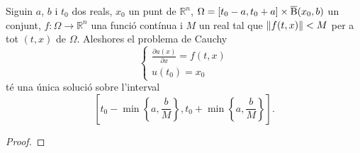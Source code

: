 \documentclass[../Apunts.tex]{subfiles}
\begin{document}
	\begin{theorem}
		\label{thm:Teorema de Peano}
		Siguin \(a\), \(b\) i \(t_{0}\) dos reals, \(x_{0}\) un punt de \(\mathbb{R}^{n}\), \(\Omega=[t_{0}-a,t_{0}+a]\times\overline{\operatorname{B}}(x_{0},b)\) un conjunt, \(f\colon\Omega\longrightarrow\mathbb{R}^{n}\) una funció contínua i \(M\) un real tal que \(\norm{f(t,x)}<M\) per a tot \((t,x)\) de \(\Omega\). Aleshores el problema de Cauchy
		\[\begin{cases*}
			\displaystyle\frac{\partial u(x)}{\partial x}=f(t,x) \\
			\displaystyle u(t_{0})=x_{0}
		\end{cases*}\]
		té una única solució sobre l'interval
		\[\left[t_{0}-\min\left\{a,\frac{b}{M}\right\},t_{0}+\min\left\{a,\frac{b}{M}\right\}\right].\]
		\begin{proof}
		\end{proof}
	\end{theorem}
	
	
	
	
	
	
	
\end{document}

